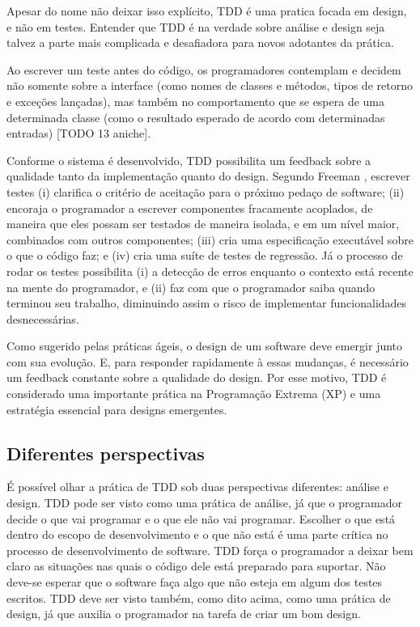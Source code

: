Apesar do nome não deixar isso explícito, TDD é uma pratica focada em design, e não em testes.
Entender que TDD é na verdade sobre análise e design seja talvez a parte mais complicada e desafiadora para novos adotantes da prática. 

Ao escrever um teste antes do código, os programadores contemplam e decidem não somente sobre a interface (como nomes de classes e 
métodos, tipos de retorno e exceções lançadas), mas também no comportamento que se espera de uma determinada classe 
(como o resultado esperado de acordo com determinadas entradas) [TODO 13 aniche].

Conforme o sistema é desenvolvido, TDD possibilita um feedback sobre a qualidade tanto da implementação quanto do design. Segundo 
Freeman \cite{GOOS}, escrever testes (i) clarifica o critério de aceitação para o próximo pedaço de software; (ii) encoraja o programador
a escrever componentes fracamente acoplados, de maneira que eles possam ser testados de maneira isolada, e em um nível maior, combinados
com outros componentes; (iii) cria uma especificação executável sobre o que o código faz; e (iv) cria uma suíte de testes de regressão.
Já o processo de rodar os testes possibilita (i) a detecção de erros enquanto o contexto está recente na mente do programador, e (ii)
faz com que o programador saiba quando terminou seu trabalho, diminuindo assim o risco de implementar funcionalidades desnecessárias.

Como sugerido pelas práticas ágeis,
o design de um software deve emergir junto com sua evolução. E, para responder rapidamente à essas mudanças, é necessário
um feedback constante sobre a qualidade do design. Por esse motivo, TDD é considerado uma importante prática na Programação 
Extrema (XP) \cite{XPExplained} e uma estratégia essencial para designs emergentes.

\subsection{Diferentes perspectivas}

É possível olhar a prática de TDD sob duas perspectivas diferentes: análise e design. 
TDD pode ser visto como uma prática de análise, já que o programador decide o que vai programar e o que ele não vai programar. Escolher o que
está dentro do escopo de desenvolvimento e o que não está é uma parte crítica no processo de desenvolvimento de software. TDD força
o programador a deixar bem claro as situações nas quais o código dele está preparado para suportar. Não deve-se esperar que
o software faça algo que não esteja em algum dos testes escritos.
TDD deve ser visto também, como dito acima, como uma prática de design, já que auxilia o programador na tarefa de criar um bom
design. 

